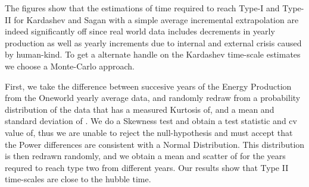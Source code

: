 \documentclass[final,5p,times,twocolumn,authoryear]{elsarticle}
\begin{document}
The figures show that the estimations of time required to reach Type-I and Type-II for Kardashev and Sagan with a simple average incremental extrapolation are indeed significantly off since real world data includes decrements in yearly production as well as yearly increments due to internal and external crisis caused by human-kind. To get a alternate handle on the Kardashev time-scale estimates we choose a Monte-Carlo approach.

First, we take the difference between succesive years of the Energy Production from the Oneworld yearly average data, and randomly redraw from a probability distribution of the data that has a measured Kurtosis of, and a mean and standard deviation of . We do a Skewness test and obtain a test statistic and cv value of, thus we are unable to reject the null-hypothesis and must accept that the Power differences  are consistent with a Normal Distribution. This distribution is then redrawn randomly, and we obtain a mean and scatter of for the years requred to reach type two from different years. Our results show that Type II  time-scales are close to the hubble time.
\end{document}
